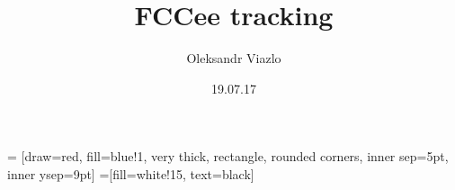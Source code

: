 \documentclass[8pt]{beamer}
\newif\ifplacelogo %
\begin{document}
\newcommand{\yRefPosOne}{0.0}
\newcommand{\xRefPosOne}{0.0}
\newcommand{\yRefPosTwo}{0.0}
\newcommand{\xRefPosTwo}{0.0}
\newcommand{\yRefIncrementOne}{0.0}
\newcommand{\xRefIncrementOne}{0.0}
\newcommand{\yRefIncrementTwo}{0.0}
\newcommand{\xRefIncrementTwo}{0.0}

\graphicspath{{/home/oviazlo/Desktop/beamerPresentations/FCCee/pictures/}}



\title[FCCee tracking \hspace{17em}\insertframenumber/
\inserttotalframenumber]{FCCee tracking}


	\author{Oleksandr Viazlo}
	\date{19.07.17\\}

\placelogofalse

\newcommand{\channel}{enuqqbb}
\newcommand{\goodChannel}{$t\bar{t} \longrightarrow W^{+}bW^{-}\bar{b} \longrightarrow q\bar{q}be^{-}\bar{\nu_{e}}\bar{b} + e^{+}\nu_{e}bq\bar{q}\bar{b}$}
\newcommand{\myNodeOne}{\tikz[baseline,inner sep=1pt] \node[anchor=base]}
\newcommand{\myNodeTwo}{\tikz[baseline,inner sep=1pt] \node[anchor=base]}

 = [draw=red, fill=blue!1, very thick,
    rectangle, rounded corners, inner sep=5pt, inner ysep=9pt]
 =[fill=white!15, text=black]
\end{document}
